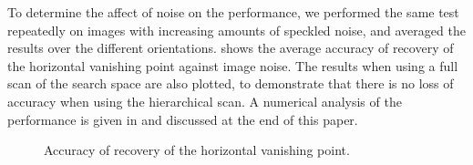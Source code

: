 To determine the affect of noise on the performance, we performed the same test
repeatedly on images with increasing amounts of speckled noise, and averaged the
results over the different orientations.   shows the
average accuracy of recovery of the horizontal vanishing point against image noise.
The results when using a full scan of the search space are also plotted, to
demonstrate that there is no loss of accuracy when using the hierarchical scan.
A numerical analysis of the performance is given in  and
discussed at the end of this paper.


\begin{figure}[t]
\centering
\begin{center}
\hspace*{4mm}
\end{center}
\caption{Accuracy of recovery of the horizontal vanishing point.}
\end{figure}






